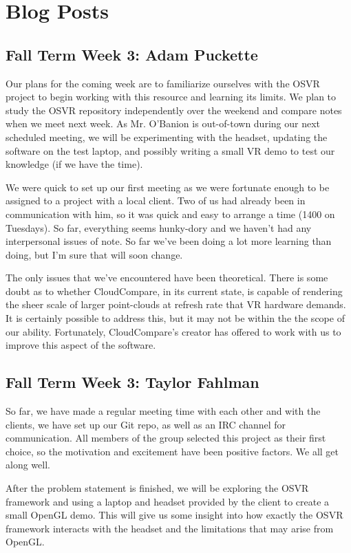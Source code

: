 \documentclass[draftclsnofoot,onecolumn]{IEEEtran}
\begin{document}
\section{Blog Posts}

\subsection{Fall Term Week 3: Adam Puckette}

Our plans for the coming week are to familiarize ourselves with the OSVR project to begin working with this resource and learning its limits. 
We plan to study the OSVR repository independently over the weekend and compare notes when we meet next week. 
As Mr. O'Banion is out-of-town during our next scheduled meeting, we will be experimenting with the headset, updating the software on the test laptop, and possibly writing a small VR demo to test our knowledge (if we have the time).

We were quick to set up our first meeting as we were fortunate enough to be assigned to a project with a local client. 
Two of us had already been in communication with him, so it was quick and easy to arrange a time (1400 on Tuesdays). 
So far, everything seems hunky-dory and we haven't had any interpersonal issues of note. 
So far we've been doing a lot more learning than doing, but I'm sure that will soon change.

The only issues that we've encountered have been theoretical. 
There is some doubt as to whether CloudCompare, in its current state, is capable of rendering the sheer scale of larger point-clouds at refresh rate that VR hardware demands. 
It is certainly possible to address this, but it may not be within the the scope of our ability. 
Fortunately, CloudCompare's creator has offered to work with us to improve this aspect of the software. 

\subsection{Fall Term Week 3: Taylor Fahlman}

So far, we have made a regular meeting time with each other and with the clients, we have set up our Git repo, as well as an IRC channel for communication. 
All members of the group selected this project as their first choice, so the motivation and excitement have been positive factors. 
We all get along well.

After the problem statement is finished, we will be exploring the OSVR framework and using a laptop and headset provided by the client to create a small OpenGL demo. 
This will give us some insight into how exactly the OSVR framework interacts with the headset and the limitations that may arise from OpenGL.
\end{document}
